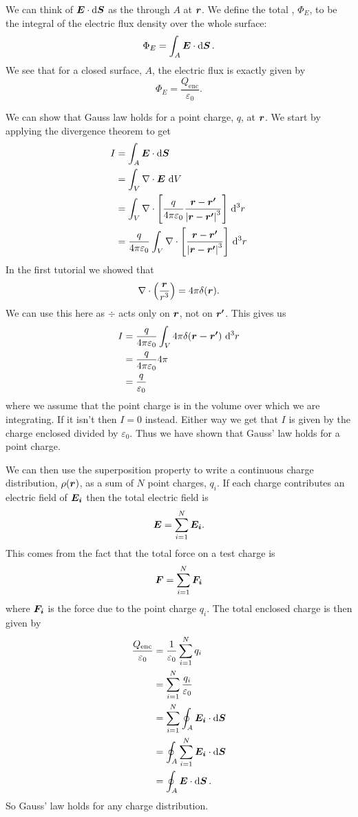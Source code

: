     We can think of \(\bm{E}\cdot\dd{\bm{S}}\) as the  through \(A\) at \(\bm{r}\).
    We define the total , \(\Phi_E\), to be the integral of the electric flux density over the whole surface:
    \[\Phi_E = \int_A \bm{E}\cdot\dd{\bm{S}}.\]
    We see that for a closed surface, \(A\), the electric flux is exactly given by
    \[\Phi_E = \frac{Q_\mathrm{enc}}{\varepsilon_0}.\]
    
    We can show that Gauss law holds for a point charge, \(q\), at \(\bm{r}\).
    We start by applying the divergence theorem to get
    \begin{align*}
        I &= \int_A \bm{E}\cdot\dd{\bm{S}}\\
        &= \int_V \nabla\cdot\bm{E}\,\dd{V}\\
        &= \int_V \nabla\cdot\left[\frac{q}{4\pi\varepsilon_0}\frac{\bm{r} - \bm{r'}}{\abs{\bm{r} - \bm{r'}}^3}\right]\,\dd[3]r\\
        &= \frac{q}{4\pi\varepsilon_0} \int_V\nabla\cdot\left[\frac{\bm{r} - \bm{r'}}{\abs{\bm{r} - \bm{r'}}^3}\right]\,\dd[3]r
    \end{align*}
    In the first tutorial we showed that
    \[\nabla\cdot\left(\frac{\bm{r}}{r^3}\right) = 4\pi\delta(\bm{r}).\]
    We can use this here as \(\div\) acts only on \(\bm{r}\), not on \(\bm{r'}\).
    This gives us
    \begin{align*}
        I &= \frac{q}{4\pi\varepsilon_0} \int_V 4\pi\delta(\bm{r - \bm{r'}})\,\dd[3]{r}\\
        &= \frac{q}{4\pi\varepsilon_0}4\pi\\
        &= \frac{q}{\varepsilon_0}
    \end{align*}
    where we assume that the point charge is in the volume over which we are integrating.
    If it isn't then \(I = 0\) instead.
    Either way we get that \(I\) is given by the charge enclosed divided by \(\varepsilon_0\).
    Thus we have shown that Gauss' law holds for a point charge.
    
    We can then use the superposition property to write a continuous charge distribution, \(\rho(\bm{r})\), as a sum of \(N\) point charges, \(q_i\).
    If each charge contributes an electric field of \(\bm{E_i}\) then the total electric field is
    \[\bm{E} = \sum_{i=1}^N \bm{E_i}.\]
    This comes from the fact that the total force on a test charge is
    \[\bm{F} = \sum_{i=1}^N \bm{F_i}\]
    where \(\bm{F_i}\) is the force due to the point charge \(q_i\).
    The total enclosed charge is then given by
    \begin{align*}
        \frac{Q_\mathrm{enc}}{\varepsilon_0} &= \frac{1}{\varepsilon_0} \sum_{i=1}^N q_i\\
        &= \sum_{i=1}^N \frac{q_i}{\varepsilon_0}\\
        &= \sum_{i=1}^N \oint_A \bm{E_i}\cdot\dd{\bm{S}}\\
        &= \oint_A \sum_{i=1}^N \bm{E_i}\cdot\dd{\bm{S}}\\
        &= \oint_A \bm{E}\cdot\dd{\bm{S}}.
    \end{align*}
    So Gauss' law holds for any charge distribution.
    
